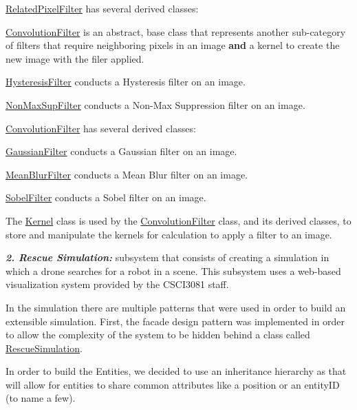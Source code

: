 \hyperlink{classRelatedPixelFilter}{Related\+Pixel\+Filter} has several derived classes\+:
\begin{DoxyItemize}
\item \hyperlink{classConvolutionFilter}{Convolution\+Filter} is an abstract, base class that represents another sub-\/category of filters that require neighboring pixels in an image {\bfseries and} a kernel to create the new image with the filer applied.
\item \hyperlink{classHysteresisFilter}{Hysteresis\+Filter} conducts a Hysteresis filter on an image.
\item \hyperlink{classNonMaxSupFilter}{Non\+Max\+Sup\+Filter} conducts a Non-\/\+Max Suppression filter on an image.
\end{DoxyItemize}

\hyperlink{classConvolutionFilter}{Convolution\+Filter} has several derived classes\+:
\begin{DoxyItemize}
\item \hyperlink{classGaussianFilter}{Gaussian\+Filter} conducts a Gaussian filter on an image.
\item \hyperlink{classMeanBlurFilter}{Mean\+Blur\+Filter} conducts a Mean Blur filter on an image.
\item \hyperlink{classSobelFilter}{Sobel\+Filter} conducts a Sobel filter on an image.
\end{DoxyItemize}

The \hyperlink{classKernel}{Kernel} class is used by the \hyperlink{classConvolutionFilter}{Convolution\+Filter} class, and its derived classes, to store and manipulate the kernels for calculation to apply a filter to an image.

{\itshape {\bfseries 2. Rescue Simulation\+:}} subsystem that consists of creating a simulation in which a drone searches for a robot in a scene. This subsystem uses a web-\/based visualization system provided by the C\+S\+C\+I3081 staff.

In the simulation there are multiple patterns that were used in order to build an extensible simulation. First, the facade design pattern was implemented in order to allow the complexity of the system to be hidden behind a class called \hyperlink{classRescueSimulation}{Rescue\+Simulation}.



In order to build the Entities, we decided to use an inheritance hierarchy as that will allow for entities to share common attributes like a position or an entity\+ID (to name a few).



